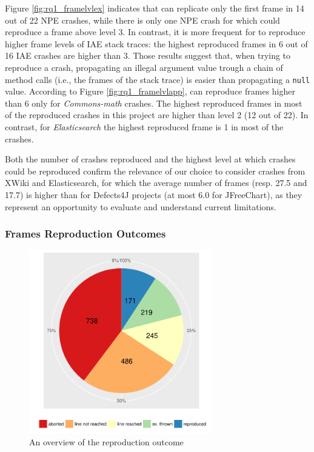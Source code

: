 Figure \ref{fig:rq1_framelvlex} indicates that \evocrash can replicate only the first frame in 14 out of 22 NPE crashes, while there is only one NPE crash for which \evocrash could reproduce a frame above level 3. 
In contrast, it is more frequent for \evocrash to reproduce higher frame levels of IAE stack traces: the highest reproduced frames in 6 out of 16 IAE crashes are higher than 3.
%
Those results suggest that, when trying to reproduce a crash, propagating an illegal argument value trough a chain of method calls (i.e., the frames of the stack trace) is easier than propagating a \texttt{null} value. 
%
According to Figure \ref{fig:rq1_framelvlapp}, \evocrash can reproduce frames higher than 6 only for \textit{Commons-math} crashes. The highest reproduced frames in most of the reproduced crashes in this project are higher than level 2 (12 out of 22). 
In contrast, for \textit{Elasticsearch} the highest reproduced frame is 1 in most of the crashes.

Both the number of crashes reproduced and the highest level at which crashes could be reproduced confirm the relevance of our choice to consider crashes from XWiki and Elasticsearch, for which the average number of frames (resp. 27.5 and 17.7) is higher than for Defects4J projects (at most 6.0 for JFreeChart), as they represent an opportunity to evaluate and understand current limitations. 

\subsubsection{Frames Reproduction Outcomes} 

\begin{figure}[t]
	\centering
	\includegraphics[width=8cm]{papers/jcrashpack/rq1_summary.pdf}
	\caption{An overview of the reproduction outcome}
	\label{fig:rq1summary}
\end{figure}

